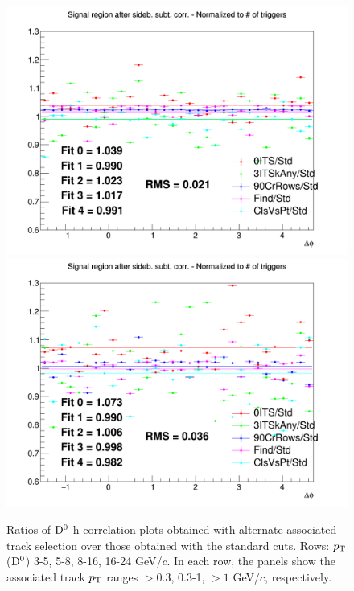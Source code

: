 \begin{figure}
{\includegraphics[width=0.31\linewidth]{figures/Systematics/Dzero/TrackCut/Ratio_AzimCorrDistr_Dzero_Canvas_PtIntBins12to13_PoolInt_thr03to1.png}}
{\includegraphics[width=0.31\linewidth]{figures/Systematics/Dzero/TrackCut/Ratio_AzimCorrDistr_Dzero_Canvas_PtIntBins12to13_PoolInt_thr1to99.png}} \\
 \caption{Ratios of ${\rm D^0}$-h correlation plots obtained with alternate associated track selection over those obtained with the standard cuts. Rows: $p_{\rm T}$(${\rm D^0}$) 3-5, 5-8, 8-16, 16-24 GeV/$c$. In each row, the panels show the associated track
$p_{\rm T}$ ranges $> 0.3$, 0.3-1, $> 1$ GeV/$c$, respectively.}
\label{fig:SysTrEff020}
\end{figure}



